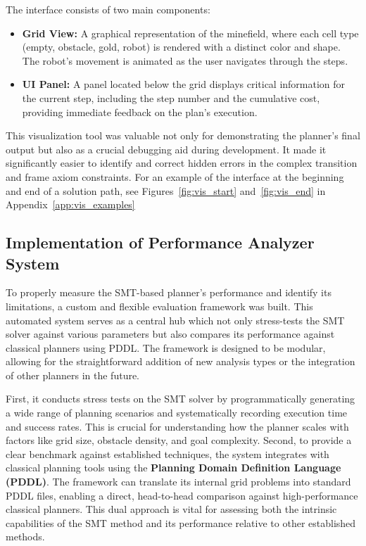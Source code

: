 \documentclass[12pt, a4paper, oneside]{report} %
\begin{document}
The interface consists of two main components:
\begin{itemize}
    \item \textbf{Grid View:} A graphical representation of the minefield, where each cell type (empty, obstacle, gold, robot) is rendered with a distinct color and shape. The robot's movement is animated as the user navigates through the steps.
    \item \textbf{UI Panel:} A panel located below the grid displays critical information for the current step, including the step number and the cumulative cost, providing immediate feedback on the plan's execution.
\end{itemize}
This visualization tool was valuable not only for demonstrating the planner's final output but also as a crucial debugging aid during development. It made it significantly easier to identify and correct hidden errors in the complex transition and frame axiom constraints. For an example of the interface at the beginning and end of a solution path, see Figures~\ref{fig:vis_start} and~\ref{fig:vis_end} in Appendix~\ref{app:vis_examples}







\subsection{Implementation of Performance Analyzer System}

To properly measure the SMT-based planner’s performance and identify its limitations, a custom and flexible evaluation framework was built. This automated system serves as a central hub which not only stress-tests the SMT solver against various parameters but also compares its performance against classical planners using PDDL. The framework is designed to be modular, allowing for the straightforward addition of new analysis types or the integration of other planners in the future.

First, it conducts stress tests on the SMT solver by programmatically generating a wide range of planning scenarios and systematically recording execution time and success rates. This is crucial for understanding how the planner scales with factors like grid size, obstacle density, and goal complexity. Second, to provide a clear benchmark against established techniques, the system integrates with classical planning tools using the \textbf{Planning Domain Definition Language (PDDL)}. The framework can translate its internal grid problems into standard PDDL files, enabling a direct, head-to-head comparison against high-performance classical planners. This dual approach is vital for assessing both the intrinsic capabilities of the SMT method and its performance relative to other established methods.
\end{document}
